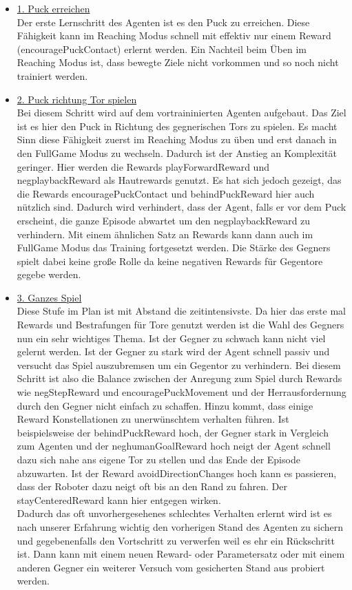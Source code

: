 \begin{itemize}
\item \underline{1. Puck erreichen} \\
Der erste Lernschritt des Agenten ist es den Puck zu erreichen. Diese Fähigkeit kann im Reaching Modus schnell mit effektiv nur einem Reward (encouragePuckContact) erlernt werden. Ein Nachteil beim Üben im Reaching Modus ist, dass bewegte Ziele nicht vorkommen und so noch nicht trainiert werden.

\item \underline{2. Puck richtung Tor spielen} \\
Bei diesem Schritt wird auf dem vortraininierten Agenten aufgebaut. Das Ziel ist es hier den Puck in Richtung des gegnerischen Tors zu spielen. Es macht Sinn diese Fähigkeit zuerst im Reaching Modus zu üben und erst danach in den FullGame Modus zu wechseln. Dadurch ist der Anstieg an Komplexität geringer. Hier werden die Rewards playForwardReward und negplaybackReward als Hautrewards genutzt. Es hat sich jedoch gezeigt, das die Rewards encouragePuckContact und behindPuckReward hier auch nützlich sind. Dadurch wird verhindert, dass der Agent, falls er vor dem Puck erscheint, die ganze Episode abwartet um den negplaybackReward zu verhindern. Mit einem ähnlichen Satz an Rewards kann dann auch im FullGame Modus das Training fortgesetzt werden. Die Stärke des Gegners spielt dabei keine große Rolle da keine negativen Rewards für Gegentore gegebe werden.  

\item \underline{3. Ganzes Spiel} \\
Diese Stufe im Plan ist mit Abstand die zeitintensivste. Da hier das erste mal Rewards und Bestrafungen für  Tore genutzt werden ist die Wahl des Gegners nun ein sehr wichtiges Thema. Ist der Gegner zu schwach kann nicht viel gelernt werden. Ist der Gegner zu stark wird der Agent schnell passiv und versucht das Spiel auszubremsen um ein Gegentor zu verhindern. Bei diesem Schritt ist also die Balance zwischen der Anregung zum Spiel durch Rewards wie negStepReward und encouragePuckMovement und der Herrausfordernung durch den Gegner nicht einfach zu schaffen. Hinzu kommt, dass einige Reward Konstellationen zu unerwünschtem verhalten führen. Ist beispielsweise der behindPuckReward hoch, der Gegner stark in Vergleich zum Agenten und der neghumanGoalReward hoch neigt der Agent schnell dazu sich nahe ans eigene Tor zu stellen und das Ende der Episode abzuwarten. Ist der Reward avoidDirectionChanges hoch kann es passieren, dass der Roboter dazu neigt oft bis an den Rand zu fahren. Der stayCenteredReward kann hier entgegen wirken. \\ 
Dadurch das oft unvorhergesehenes schlechtes Verhalten erlernt wird ist es nach unserer Erfahrung wichtig den vorherigen Stand des Agenten zu sichern und gegebenenfalls den Vortschritt zu verwerfen weil es ehr ein Rückschritt ist. Dann kann mit einem neuen Reward- oder Parametersatz oder mit einem anderen Gegner ein weiterer Versuch vom gesicherten Stand aus probiert werden. 
\end{itemize}


